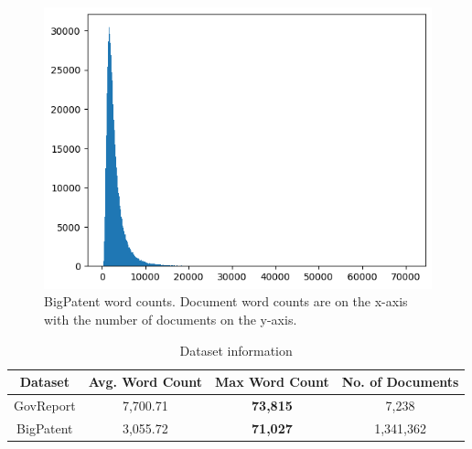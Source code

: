 	\begin{figure}[!ht]
		\centering
		\includegraphics[width=.48\textwidth]{Images/bigpatent-wordcount.png}
		\caption{
			BigPatent word counts.
			Document word counts are on the x-axis with the number of documents on the y-axis.
		}
		\label{fig:bigpatent}
	\end{figure}


	\begin{table}[!ht]
		\centering

		\begin{tabular}{c c c c}
			\hline
			Dataset & Avg. Word Count & Max Word Count & No. of Documents \\
			\hline
			GovReport & 7,700.71 & \textbf{73,815} & 7,238 \\
			BigPatent & 3,055.72 & \textbf{71,027} & 1,341,362 \\
			\hline
		\end{tabular}

		\caption{Dataset information}
		\label{tab:datasets}
	\end{table}

